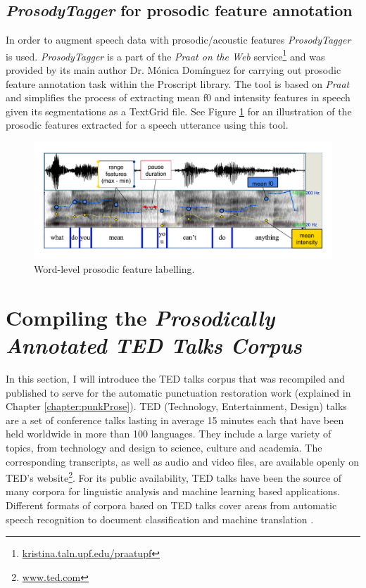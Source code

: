 \subsection{\textit{ProsodyTagger} for prosodic feature annotation}
In order to augment speech data with prosodic/acoustic features \textit{ProsodyTagger} is used. \textit{ProsodyTagger} \citep{tagger} is a part of the \textit{Praat on the Web} service\footnote{\url{kristina.taln.upf.edu/praatupf}} \citep{praatontheweb} and was provided by its main author Dr. Mónica Domínguez for carrying out prosodic feature annotation task within the Proscript library. The tool is based on \textit{Praat} and simplifies the process of extracting mean f0 and intensity features in speech given its segmentations as a TextGrid file. See Figure \ref{corpusWorks:figure:pros_features} for an illustration of the prosodic features extracted for a speech utterance using this tool. 

\begin{figure}
\centering\includegraphics[width=\linewidth]{img/pros_features.pdf}
\caption{Word-level prosodic feature labelling.}
\label{corpusWorks:figure:pros_features}
\end{figure}

\section{Compiling the \textit{Prosodically Annotated TED Talks Corpus}}
\label{corpusWorks:ted}

In this section, I will introduce the TED talks corpus that was recompiled and published to serve for the automatic punctuation restoration work (explained in Chapter \ref{chapter:punkProse}). TED (Technology, Entertainment, Design) talks are a set of conference talks lasting in average 15 minutes each that have been held worldwide in more than 100 languages. They include a large variety of topics, from technology and design to science, culture and academia.  The corresponding transcripts, as well as audio and video files, are available openly on TED's website\footnote{\url{www.ted.com}}. For its public availability, TED talks have been the source of many corpora for linguistic analysis and machine learning based applications. Different formats of corpora based on TED talks cover areas from automatic speech recognition \citep{tedlium} to document classification \citep{Hermann:2014:ACLphil} and machine translation \citep{cettoloEtAl:EAMT2012}. 

